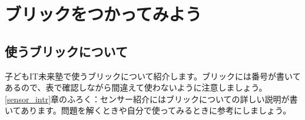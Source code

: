 \section{ブリックをつかってみよう}
\subsection{使うブリックについて}
子どもIT未来塾で使うブリックについて紹介します。ブリックには番号が書いてあるので、表で確認しながら間違えて使わないように注意しましょう。\ref{sensor_intr}章のふろく：センサー紹介にはブリックについての詳しい説明が書いてあります。問題を解くときや自分で使ってみるときに参考にしましょう。\\

\newlength{\colA}
\setlength{\colA}{0.15\columnwidth}
\newlength{\colB}
\setlength{\colB}{0.15\columnwidth}
\newlength{\colC}
\setlength{\colC}{0.3\columnwidth}
\newlength{\colD}
\setlength{\colD}{0.2\columnwidth}
\newlength{\colE}
\setlength{\colE}{0.07\columnwidth}

